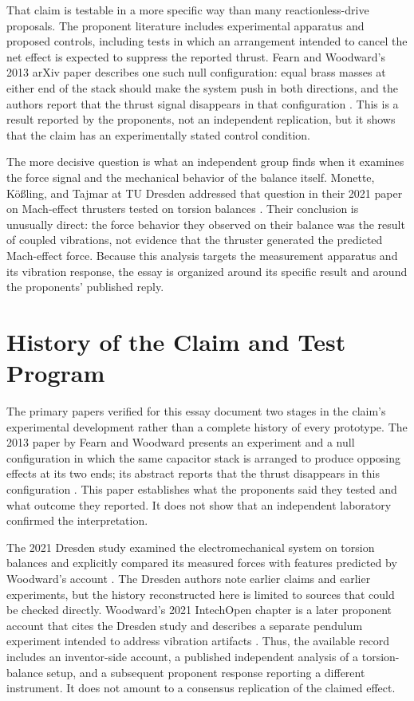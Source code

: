 \documentclass[11pt]{article}
\begin{document}
That claim is testable in a more specific way than many reactionless-drive proposals. The proponent literature includes experimental apparatus and proposed controls, including tests in which an arrangement intended to cancel the net effect is expected to suppress the reported thrust. Fearn and Woodward's 2013 arXiv paper describes one such null configuration: equal brass masses at either end of the stack should make the system push in both directions, and the authors report that the thrust signal disappears in that configuration \cite{FearnWoodward2013}. This is a result reported by the proponents, not an independent replication, but it shows that the claim has an experimentally stated control condition.

The more decisive question is what an independent group finds when it examines the force signal and the mechanical behavior of the balance itself. Monette, Kößling, and Tajmar at TU Dresden addressed that question in their 2021 paper on Mach-effect thrusters tested on torsion balances \cite{Monette2021}. Their conclusion is unusually direct: the force behavior they observed on their balance was the result of coupled vibrations, not evidence that the thruster generated the predicted Mach-effect force. Because this analysis targets the measurement apparatus and its vibration response, the essay is organized around its specific result and around the proponents' published reply.

\section{History of the Claim and Test Program}

The primary papers verified for this essay document two stages in the claim's experimental development rather than a complete history of every prototype. The 2013 paper by Fearn and Woodward presents an experiment and a null configuration in which the same capacitor stack is arranged to produce opposing effects at its two ends; its abstract reports that the thrust disappears in this configuration \cite{FearnWoodward2013}. This paper establishes what the proponents said they tested and what outcome they reported. It does not show that an independent laboratory confirmed the interpretation.

The 2021 Dresden study examined the electromechanical system on torsion balances and explicitly compared its measured forces with features predicted by Woodward's account \cite{Monette2021}. The Dresden authors note earlier claims and earlier experiments, but the history reconstructed here is limited to sources that could be checked directly. Woodward's 2021 IntechOpen chapter is a later proponent account that cites the Dresden study and describes a separate pendulum experiment intended to address vibration artifacts \cite{Woodward2021}. Thus, the available record includes an inventor-side account, a published independent analysis of a torsion-balance setup, and a subsequent proponent response reporting a different instrument. It does not amount to a consensus replication of the claimed effect.
\end{document}
